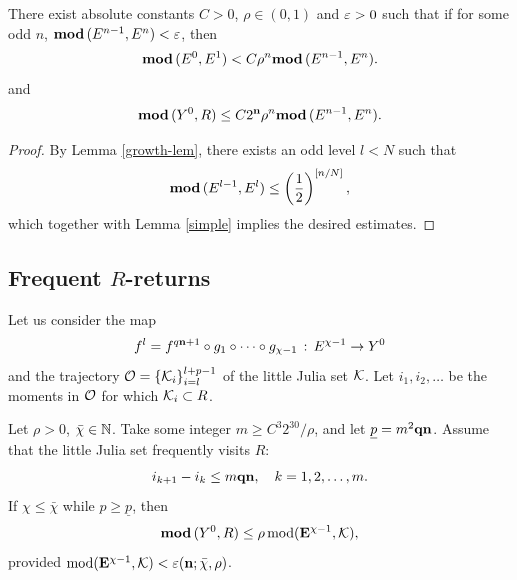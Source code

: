 \begin{lem}\label{exp decay}
   There exist absolute constants $C>0$, $\rho\in (0,1)$ and ${\varepsilon}>0$
such that if for some odd $n$,  ${ \mathbf{mod}\, }(E^{n-1}, E^n)<{\varepsilon}$,
then
$$
   { \mathbf{mod}\, }(E^0, E^1)< C \rho^n { \mathbf{mod}\, }(E^{n-1}, E^n).
$$
and
$$
   { \mathbf{mod}\, }(Y^0, R)\leq  C 2^{\mathbf{n}} \rho^n { \mathbf{mod}\, }(E^{n-1}, E^n).
$$
\end{lem}

\begin{proof}
  By Lemma \ref{growth-lem},
there exists an odd level $l<N$ such that
$$
   { \mathbf{mod}\, }(E^{l-1}, E^l) \leq \left(\frac{1}{2}\right)^{[n/N]},
$$
which together with Lemma \ref{simple} implies the desired estimates.
\end{proof}

\subsection{Frequent $R$-returns}

 Let us consider the map
\begin{equation}\label{l}
    f^l= f^{q{\mathbf{n}}+1} \circ g_1\circ\dots  \circ g_{\chi-1}\, :\, E^{\chi-1}\rightarrow Y^0
\end{equation}
and the trajectory ${\mathcal O}= \{{\mathcal K}_i\}_{i=l}^{l+p-1}$
of the little Julia set ${\mathcal K}$. Let $i_1, i_2,\dots$ be the moments in ${\mathcal O}$
for which ${\mathcal K}_i\subset  R$.

\begin{lem}\label{frequent returns}
Let $\rho>0$,  $\bar\chi\in {\Bbb N}$.
Take some integer $m\geq C^3 2^{30}/\rho$, and let $\underline p= m^2{\mathbf{q}}{\mathbf{n}}$.
Assume that the little Julia set frequently visits $R$:
\begin{equation}\label{frequent visits}
    i_{k+1}- i_k \leq m{\mathbf{q}}{\mathbf{n}} ,\quad k=1,2,\dots, m.
\end{equation}
If $\chi\leq \bar\chi$ while $p\geq \underline p$,
then
$$
  { \mathbf{mod}\, } (Y^0, R) \leq \rho \operatorname{mod}({\mathbf{E}}^{\chi-1}, {\mathcal K}),
$$
provided $\operatorname{mod}({\mathbf{E}}^{\chi-1}, {\mathcal K})< {\varepsilon}({\mathbf{n}}; \bar\chi, \rho)$.
\end{lem}

